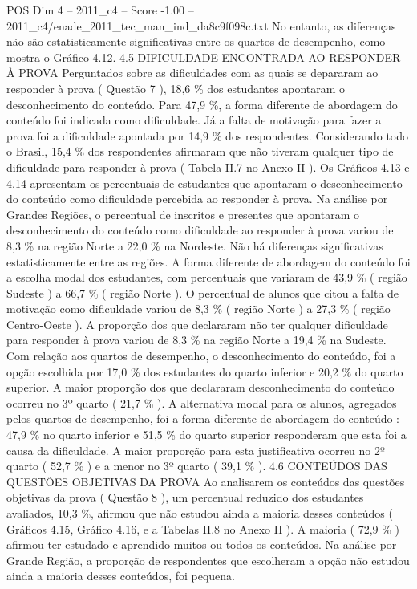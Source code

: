 \begin{textsample}{POS Dim 4 – 2011\_c4 – Score -1.00 – 2011\_c4/enade\_2011\_tec\_man\_ind\_da8c9f098c.txt}
No entanto, as diferenças não são estatisticamente significativas entre os quartos de desempenho, como mostra o Gráfico 4.12. 4.5 DIFICULDADE ENCONTRADA AO RESPONDER À PROVA Perguntados sobre as dificuldades com as quais se depararam ao responder à prova ( Questão 7 ), 18,6 \% dos estudantes apontaram o desconhecimento do conteúdo.
Para 47,9 \%, a forma diferente de abordagem do conteúdo foi indicada como dificuldade.
Já a falta de motivação para fazer a prova foi a dificuldade apontada por 14,9 \% dos respondentes.
Considerando todo o Brasil, 15,4 \% dos respondentes afirmaram que não tiveram qualquer tipo de dificuldade para responder à prova ( Tabela II.7 no Anexo II ).
Os Gráficos 4.13 e 4.14 apresentam os percentuais de estudantes que apontaram o desconhecimento do conteúdo como dificuldade percebida ao responder à prova.
Na análise por Grandes Regiões, o percentual de inscritos e presentes que apontaram o desconhecimento do conteúdo como dificuldade ao responder à prova variou de 8,3 \% na região Norte a 22,0 \% na Nordeste.
Não há diferenças significativas estatisticamente entre as regiões.
A forma diferente de abordagem do conteúdo foi a escolha modal dos estudantes, com percentuais que variaram de 43,9 \% ( região Sudeste ) a 66,7 \% ( região Norte ).
O percentual de alunos que citou a falta de motivação como dificuldade variou de 8,3 \% ( região Norte ) a 27,3 \% ( região Centro-Oeste ).
A proporção dos que declararam não ter qualquer dificuldade para responder à prova variou de 8,3 \% na região Norte a 19,4 \% na Sudeste.
Com relação aos quartos de desempenho, o desconhecimento do conteúdo, foi a opção escolhida por 17,0 \% dos estudantes do quarto inferior e 20,2 \% do quarto superior.
A maior proporção dos que declararam desconhecimento do conteúdo ocorreu no 3º quarto ( 21,7 \% ).
A alternativa modal para os alunos, agregados pelos quartos de desempenho, foi a forma diferente de abordagem do conteúdo : 47,9 \% no quarto inferior e 51,5 \% do quarto superior responderam que esta foi a causa da dificuldade.
A maior proporção para esta justificativa ocorreu no 2º quarto ( 52,7 \% ) e a menor no 3º quarto ( 39,1 \% ). 4.6 CONTEÚDOS DAS QUESTÕES OBJETIVAS DA PROVA Ao analisarem os conteúdos das questões objetivas da prova ( Questão 8 ), um percentual reduzido dos estudantes avaliados, 10,3 \%, afirmou que não estudou ainda a maioria desses conteúdos ( Gráficos 4.15, Gráfico 4.16, e a Tabelas II.8 no Anexo II ).
A maioria ( 72,9 \% ) afirmou ter estudado e aprendido muitos ou todos os conteúdos.
Na análise por Grande Região, a proporção de respondentes que escolheram a opção não estudou ainda a maioria desses conteúdos, foi pequena.

\end{textsample}
